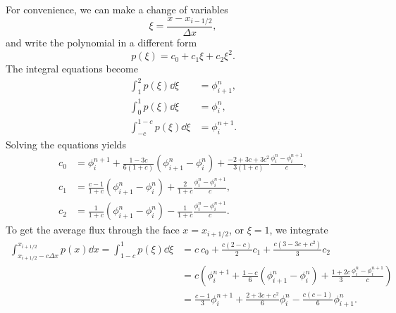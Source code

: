 \documentclass[../thesis.tex]{subfiles}
\begin{document}
For convenience, we can make a change of variables
\begin{equation}
    \xi = \frac{x-x_{i-1/2}}{\Delta x},
\end{equation}
and write the polynomial in a different form
\begin{equation}\label{eqn: parabola-xi}
    p(\xi) = c_0 + c_1\xi + c_2\xi^2.
\end{equation}
The integral equations become
\begin{equation}\label{eqn: parabola-integral-xi}
    \begin{split}
        \int_{1}^{2} p(\xi) \dd{\xi}
        &= \phi_{i+1}^{n},
        \\
        \int_{0}^{1} p(\xi) \dd{\xi}
        &= \phi_{i}^{n},
        \\
        \int_{-c}^{1-c} p(\xi) \dd{\xi}
        &= \phi_{i}^{n+1}.
    \end{split}
\end{equation}
Solving the equations yields
\begin{equation}
    \begin{split}
        c_0 &= \phi_{i}^{n+1}
        +\frac{1-3c}{6(1+c)}
        \left( \phi_{i+1}^{n}-\phi_{i}^{n} \right)
        +\frac{-2+3c+3c^2}{3(1+c)}
        \frac{\phi_{i}^{n}-\phi_{i}^{n+1}}{c},
        \\
        c_1 &=
        \frac{c-1}{1+c}
        \left( \phi_{i+1}^{n}-\phi_{i}^{n} \right)
        +\frac{2}{1+c}
        \frac{\phi_{i}^{n}-\phi_{i}^{n+1}}{c},
        \\
        c_2 &=
        \frac{1}{1+c}
        \left( \phi_{i+1}^{n}-\phi_{i}^{n} \right)
        -\frac{1}{1+c}
        \frac{\phi_{i}^{n}-\phi_{i}^{n+1}}{c}.
    \end{split}
\end{equation}
To get the average flux through the face \(x = x_{i+1/2}\), or \(\xi = 1\), we integrate
\begin{equation}
    \begin{split}
        \int_{x_{i+1/2}-c\Delta x}^{x_{i+1/2}} p(x) \dd{x}
        =
        \int_{1-c}^{1} p(\xi) \dd{\xi}
        &= c~c_0 + \frac{c(2-c)}{2}c_1 + \frac{c(3-3c+c^2)}{3}c_2
        \\
        &=c \left( \phi_{i}^{n+1}
        +\frac{1-c}{6}\left( \phi_{i+1}^{n}-\phi_{i}^{n} \right)
        +\frac{1+2c}{3}
        \frac{\phi_{i}^{n}-\phi_{i}^{n+1}}{c} \right)
        \\
        &= \frac{c-1}{3}\phi_{i}^{n+1}
        +\frac{2+3c+c^2}{6}\phi_{i}^{n}
        -\frac{c(c-1)}{6}\phi_{i+1}^{n}.
    \end{split}
\end{equation}
\end{document}
